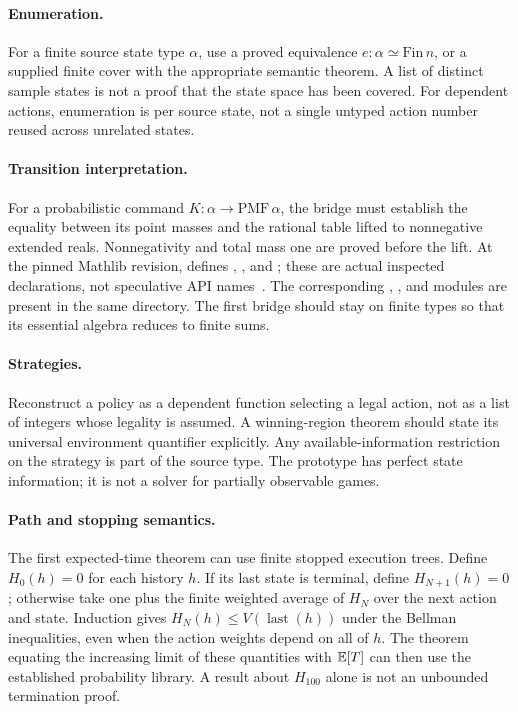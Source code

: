 \paragraph{Enumeration.}
For a finite source state type $\alpha$, use a proved equivalence
$e:\alpha\simeq\mathrm{Fin}\,n$, or a supplied finite cover with the appropriate
semantic theorem. A list of distinct sample states is not a proof that the
state space has been covered. For dependent actions, enumeration is per source
state, not a single untyped action number reused across unrelated states.

\paragraph{Transition interpretation.}
For a probabilistic command $K:\alpha\to\mathrm{PMF}\,\alpha$, the bridge must
establish the equality between its point masses and the rational table lifted
to nonnegative extended reals. Nonnegativity and total mass one are proved
before the lift. At the pinned Mathlib revision,
 defines
, , and ; these are actual
inspected declarations, not speculative API names~\cite{mathlib-pmf}.
The corresponding , , and 
modules are present in the same directory. The first bridge should stay on
finite types so that its essential algebra reduces to finite sums.

\paragraph{Strategies.}
Reconstruct a policy as a dependent function selecting a legal action, not as a
list of integers whose legality is assumed. A winning-region theorem should
state its universal environment quantifier explicitly. Any available-information
restriction on the strategy is part of the source type. The prototype has
perfect state information; it is not a solver for partially observable games.

\paragraph{Path and stopping semantics.}
The first expected-time theorem can use finite stopped execution trees.
Define $H_0(h)=0$ for each history $h$. If its last state is terminal, define
$H_{N+1}(h)=0$; otherwise take one plus the finite weighted average of
$H_N$ over the next action and state. Induction gives
$H_N(h)\le V(\operatorname{last}(h))$ under the Bellman inequalities, even when
the action weights depend on all of $h$. The theorem equating the increasing
limit of these quantities with $\mathbb{E}[T]$ can then use the established probability
library. A result about $H_{100}$ alone is not an unbounded termination proof.

